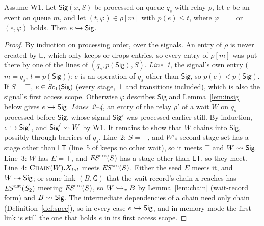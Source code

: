 \begin{lemma}[Relays]\label{lem:clock}
Assume W1. Let $\mathsf{Sig}(x,S)$ be processed on queue $q_s$ with relay $\rho$, let $e$ be an event on queue $m$,
and let $(t, \varphi) \in \rho[m]$ with $p(e) \le t$, where $\varphi = \bot$ or $(e,\varphi)$ holds. Then
$e \hookrightarrow \mathsf{Sig}$.
\end{lemma}
\begin{proof}
By induction on processing order, over the signals. An entry of $\rho$ is never created by $\sqcup$, which only keeps
or drops entries, so every entry of $\rho[m]$ was put there by one of the lines of $(q_s, p(\mathsf{Sig}),
S)$. \emph{Line~1}, the signal's own entry ($m = q_s$, $t = p(\mathsf{Sig})$): $e$ is an operation of $q_s$ other than
$\mathsf{Sig}$, so $p(e) < p(\mathsf{Sig})$. If $S = \top$, $e \in \mathit{Sc}_{1}(\mathsf{Sig})$ (every stage, $\bot$ and
transitions included), which is also the signal's first access scope. Otherwise $\varphi$ describes $\mathsf{Sig}$ and
Lemma~\ref{lem:insig} below gives $e \hookrightarrow \mathsf{Sig}$. \emph{Lines~2--4}, an entry of the relay $\rho'$ of a wait
$W$ on $q_s$ processed before $\mathsf{Sig}$, whose signal $\mathsf{Sig}'$ was processed earlier still. By induction,
$e \hookrightarrow \mathsf{Sig}'$, and $\mathsf{Sig}' \rightsquigarrow W$ by W1. It remains to show that $W$ chains into $\mathsf{Sig}$,
possibly through barriers of $q_s$. Line~2: $S = \top$, and $W$'s second stage set has a stage other than $\mathsf{LT}$
(line~5 of  keeps no other wait), so it meets $\top$ and $W \rightsquigarrow \mathsf{Sig}$. Line~3: $W$ has $E =
\top$, and $\mathit{ES}^{\mathrm{src}}(S)$ has a stage other than $\mathsf{LT}$, so they meet. Line~4: $\textsc{Chain}(W).X_{\mathit{tot}}$ meets
$\mathit{ES}^{\mathrm{src}}(S)$. Either the seed $E$ meets it, and $W \rightsquigarrow \mathsf{Sig}$; or some link $(B,\mathsf{G})$ that the wait
record's chain x-reaches has $\mathit{ES}^{\mathrm{dst}}(S_2)$ meeting $\mathit{ES}^{\mathrm{src}}(S)$, so $W \hookrightarrow_x B$ by Lemma~\ref{lem:chain} (wait-record
form) and $B \rightsquigarrow \mathsf{Sig}$. The intermediate dependencies of a chain need only chain (Definition~\ref{def:spec}), so in
every case $e \hookrightarrow \mathsf{Sig}$, and in memory mode the first link is still the one that holds $e$ in its first
access scope.
\end{proof}

